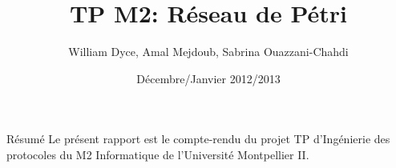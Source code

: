 \documentclass[a4paper, 12pt]{article}
\title{TP M2: Réseau de Pétri} \author{William Dyce, Amal Mejdoub, Sabrina Ouazzani-Chahdi}
\date{Décembre/Janvier 2012/2013}
\begin{document}
\newcommand\bcdef{\texttt{[image: def.png]}}

\maketitle

\begin{bclogo}[couleur=blue!15, arrondi=0.1, logo= \bcdef,
    ombre=true, epOmbre=0.25, couleurOmbre=black!30, epBarre=1,
    barre=zigzag]{Résumé} Le présent rapport est le compte-rendu du
  projet TP d'Ingénierie des protocoles du M2 Informatique de
  l'Université Montpellier II.
\end{bclogo}


\pagebreak

\pagebreak

\pagebreak

\pagebreak

\pagebreak

\pagebreak

\pagebreak

\end{document}
